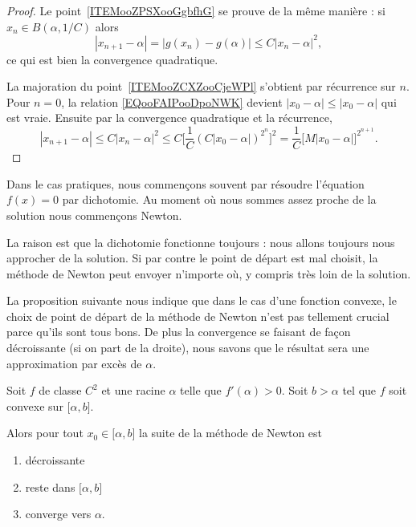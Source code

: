 \begin{proof}
	Le point~\ref{ITEMooZPSXooGgbfhG} se prouve de la même manière : si \( x_n\in B(\alpha,1/C)\) alors
	\begin{equation}
		| x_{n+1}-\alpha |=| g(x_n)-g(\alpha) |\leq C| x_n-\alpha |^2,
	\end{equation}
	ce qui est bien la convergence quadratique.

	La majoration du point~\ref{ITEMooZCXZooCjeWPl} s'obtient par récurrence sur \( n\). Pour \( n=0\), la relation \eqref{EQooFAIPooDpoNWK} devient \( | x_0-\alpha |\leq | x_0-\alpha |\) qui est vraie. Ensuite par la convergence quadratique et la récurrence,
	\begin{equation}
		| x_{n+1}-\alpha |\leq C| x_n-\alpha |^2\leq C\big[  \frac{1}{ C }(C| x_0-\alpha |)^{2^n}  \big]^2=\frac{1}{ C }\big[ M| x_0-\alpha | \big]^{2^{n+1}}.
	\end{equation}
\end{proof}

\begin{normaltext}
	Dans le cas pratiques, nous commençons souvent par résoudre l'équation \( f(x)=0\) par dichotomie. Au moment où nous sommes assez proche de la solution nous commençons Newton.

	La raison est que la dichotomie fonctionne toujours : nous allons toujours nous approcher de la solution. Si par contre le point de départ est mal choisit, la méthode de Newton peut envoyer n'importe où, y compris très loin de la solution.
\end{normaltext}

La proposition suivante nous indique que dans le cas d'une fonction convexe, le choix de point de départ de la méthode de Newton n'est pas tellement crucial parce qu'ils sont tous bons. De plus la convergence se faisant de façon décroissante (si on part de la droite), nous savons que le résultat sera une approximation par excès de \( \alpha\).
\begin{proposition}     \label{PROPooVTSAooAtSLeI}
	Soit \( f\) de classe \( C^2\) et une racine \( \alpha\) telle que \( f'(\alpha)>0\). Soit \( b>\alpha \) tel que \( f\) soit convexe sur \( \mathopen[ \alpha , b \mathclose]\).

	Alors pour tout \( x_0\in\mathopen[ \alpha , b \mathclose]\) la suite de la méthode de Newton est
	\begin{enumerate}
		\item
		      décroissante
		\item
		      reste dans \( \mathopen[ \alpha , b \mathclose]\)
		\item
		      converge vers \( \alpha\).
	\end{enumerate}
\end{proposition}

